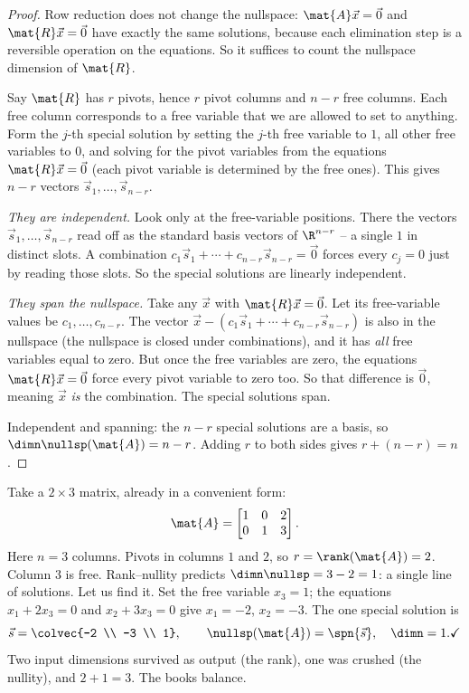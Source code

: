 \begin{proof}
Row reduction does not change the nullspace: $\mat{A}\vec{x}=\vec0$ and
$\mat{R}\vec{x}=\vec0$ have exactly the same solutions, because each elimination
step is a reversible operation on the equations. So it suffices to count the
nullspace dimension of $\mat{R}$.

Say $\mat{R}$ has $r$ pivots, hence $r$ pivot columns and $n-r$ free columns.
Each free column corresponds to a free variable that we are allowed to set to
anything. Form the $j$-th special solution by setting the $j$-th free variable
to $1$, all other free variables to $0$, and solving for the pivot variables from
the equations $\mat{R}\vec{x}=\vec0$ (each pivot variable is determined by the
free ones). This gives $n-r$ vectors $\vec{s}_1,\dots,\vec{s}_{n-r}$.

\emph{They are independent.} Look only at the free-variable positions. There the
vectors $\vec{s}_1,\dots,\vec{s}_{n-r}$ read off as the standard basis vectors of
$\R^{n-r}$ -- a single $1$ in distinct slots. A combination
$c_1\vec{s}_1+\cdots+c_{n-r}\vec{s}_{n-r}=\vec0$ forces every $c_j=0$ just by
reading those slots. So the special solutions are linearly independent.

\emph{They span the nullspace.} Take any $\vec{x}$ with $\mat{R}\vec{x}=\vec0$.
Let its free-variable values be $c_1,\dots,c_{n-r}$. The vector
$\vec{x} - (c_1\vec{s}_1+\cdots+c_{n-r}\vec{s}_{n-r})$ is also in the nullspace
(the nullspace is closed under combinations), and it has \emph{all} free
variables equal to zero. But once the free variables are zero, the equations
$\mat{R}\vec x = \vec 0$ force every pivot variable to zero too. So that
difference is $\vec0$, meaning $\vec{x}$ \emph{is} the combination. The special
solutions span.

Independent and spanning: the $n-r$ special solutions are a basis, so
$\dimn\nullsp(\mat{A}) = n-r$. Adding $r$ to both sides gives $r + (n-r) = n$.
\end{proof}

\begin{example}\label{ch16:rn-example}
Take a $2\times 3$ matrix, already in a convenient form:
\[
  \mat{A} = \begin{bmatrix} 1 & 0 & 2 \\ 0 & 1 & 3 \end{bmatrix}.
\]
Here $n = 3$ columns. Pivots in columns $1$ and $2$, so $r = \rank(\mat{A}) = 2$.
Column $3$ is free. Rank--nullity predicts $\dimn\nullsp = 3 - 2 = 1$: a single
line of solutions. Let us find it. Set the free variable $x_3 = 1$; the equations
$x_1 + 2x_3 = 0$ and $x_2 + 3x_3 = 0$ give $x_1 = -2$, $x_2 = -3$. The one special
solution is
\[
  \vec{s} = \colvec{-2 \\ -3 \\ 1}, \qquad
  \nullsp(\mat{A}) = \spn\{\vec{s}\}, \quad \dimn = 1. \checkmark
\]
Two input dimensions survived as output (the rank), one was crushed (the
nullity), and $2 + 1 = 3$. The books balance.
\end{example}

